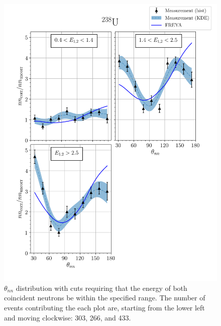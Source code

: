 \begin{figure}
\centering
    \includegraphics[width = 1.1\textwidth]{Content/Results/FinalDUResultw_freya2KDE.png}
    \caption{ $\theta_{nn}$ distribution with cuts requiring that the energy of both coincident neutrons be within the specified range.
    The number of events contributing the each plot are, starting from the lower left and moving clockwise: 303, 266, and 433.}
    \label{fig:DU(2)}
\end{figure}
